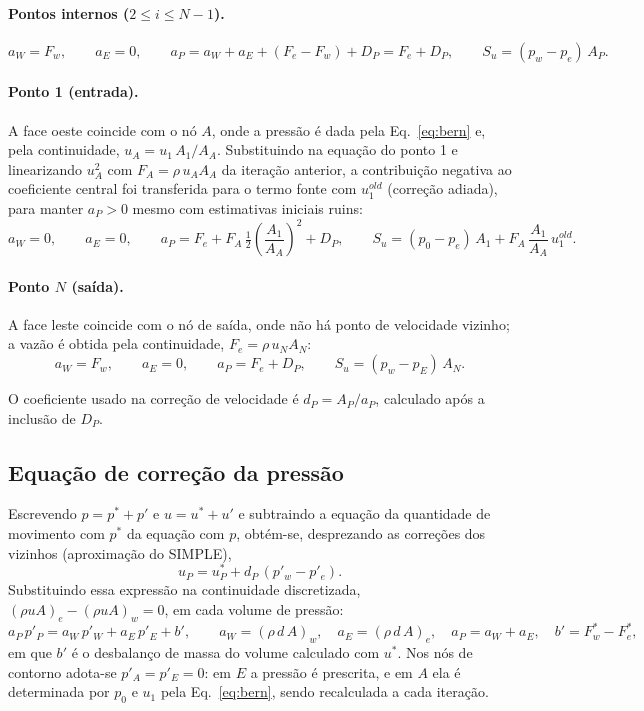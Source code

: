 \documentclass[11pt,a4paper]{article}
\begin{document}
\paragraph{Pontos internos ($2\le i\le N-1$).}
\[
  a_W=F_w,\qquad a_E=0,\qquad
  a_P=a_W+a_E+(F_e-F_w)+D_P=F_e+D_P,\qquad
  S_u=(p_w-p_e)\,A_P .
\]

\paragraph{Ponto 1 (entrada).}
A face oeste coincide com o nó $A$, onde a pressão é dada pela
Eq.~\eqref{eq:bern} e, pela continuidade, $u_A=u_1\,A_1/A_A$. Substituindo
na equação do ponto 1 e linearizando $u_A^2$ com $F_A=\rho\,u_A A_A$ da
iteração anterior, a contribuição negativa ao coeficiente central foi
transferida para o termo fonte com $u_1^{old}$ (correção adiada), para
manter $a_P>0$ mesmo com estimativas iniciais ruins:
\[
  a_W=0,\qquad a_E=0,\qquad
  a_P=F_e+F_A\,\tfrac12\left(\frac{A_1}{A_A}\right)^2+D_P,\qquad
  S_u=(p_0-p_e)\,A_1+F_A\,\frac{A_1}{A_A}\,u_1^{old} .
\]

\paragraph{Ponto $N$ (saída).}
A face leste coincide com o nó de saída, onde não há ponto de velocidade
vizinho; a vazão é obtida pela continuidade, $F_e=\rho\,u_N A_N$:
\[
  a_W=F_w,\qquad a_E=0,\qquad a_P=F_e+D_P,\qquad
  S_u=(p_w-p_E)\,A_N .
\]

O coeficiente usado na correção de velocidade é $d_P=A_P/a_P$, calculado
após a inclusão de $D_P$.

\subsection{Equação de correção da pressão}

Escrevendo $p=p^*+p'$ e $u=u^*+u'$ e subtraindo a equação da quantidade
de movimento com $p^*$ da equação com $p$, obtém-se, desprezando as
correções dos vizinhos (aproximação do SIMPLE),
\begin{equation}
  u_P=u_P^*+d_P\,(p'_w-p'_e) .
\end{equation}
Substituindo essa expressão na continuidade discretizada,
$(\rho uA)_e-(\rho uA)_w=0$, em cada volume de pressão:
\begin{equation}
  a_P\,p'_P=a_W\,p'_W+a_E\,p'_E+b',
  \qquad
  a_W=(\rho\,d\,A)_w,\quad a_E=(\rho\,d\,A)_e,\quad
  a_P=a_W+a_E,\quad b'=F_w^*-F_e^* ,
\end{equation}
em que $b'$ é o desbalanço de massa do volume calculado com $u^*$.
Nos nós de contorno adota-se $p'_A=p'_E=0$: em $E$ a pressão é prescrita,
e em $A$ ela é determinada por $p_0$ e $u_1$ pela Eq.~\eqref{eq:bern},
sendo recalculada a cada iteração.
\end{document}
